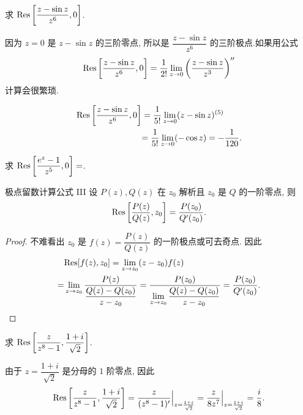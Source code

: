 \begin{example}
	求 ${\mathrm{Res}}\left[\dfrac{z-\sin z}{z^6},0\right]$.
\end{example}

\begin{solution}
		因为 $z=0$ 是 $z-\sin z$ 的三阶零点,
	{所以是 $\dfrac{z-\sin z}{z^6}$ 的三阶极点.如果用公式
		\[{\mathrm{Res}}\left[\frac{z-\sin z}{z^6},0\right]
		=\frac1{2!}\lim_{z\to0}\left(\frac{z-\sin z}{z^3}\right)''\]
		计算会很繁琐.
	}

	{
	\begin{align*}
		{\mathrm{Res}}\left[\frac{z-\sin z}{z^6},0\right]&=\frac1{5!}\lim_{z\to0}(z-\sin z)^{(5)}\\
		&{=\frac1{5!}\lim_{z\to0}(-\cos z)=-\frac1{120}.}
	\end{align*}}
\end{solution}

\begin{exercise}
		求 ${\mathrm{Res}}\left[\dfrac{e^z-1}{z^5},0\right]=$.
\end{exercise}

\begin{theorem}{极点留数计算公式 III}
	设 $P(z),Q(z)$ 在 $z_0$ 解析且 $z_0$ 是 $Q$ 的一阶零点, 则
	\[{\mathrm{Res}}\left[\frac{P(z)}{Q(z)},z_0\right]=\frac{P(z_0)}{Q'(z_0)}.\]
\end{theorem}

\begin{proof}
	不难看出 $z_0$ 是 $f(z)=\dfrac{P(z)}{Q(z)}$ 的一阶极点或可去奇点. 因此
	\begin{align*}
			&{\mathrm{Res}}[f(z),z_0]=\lim_{z\to z_0}(z-z_0)f(z)\\
		=&\lim_{z\to z_0}\frac{P(z)}{\dfrac{Q(z)-Q(z_0)}{z-z_0}}
		=\frac{P(z_0)}{\lim\limits_{z\to z_0}\dfrac{Q(z)-Q(z_0)}{z-z_0}}=\frac{P(z_0)}{Q'(z_0)}.\qedhere
	\end{align*}
\end{proof}

\begin{example}
	求 ${\mathrm{Res}}\left[\dfrac{z}{z^8-1},\dfrac{1+i}{\sqrt2}\right]$.
\end{example}

\begin{solution}
		由于 $z=\dfrac{1+i}{\sqrt2}$ 是分母的 $1$ 阶零点,
	{因此
		\[{\mathrm{Res}}\left[\frac z{z^8-1},\frac{1+i}{\sqrt2}\right]
		=\frac z{(z^8-1)'}\Big|_{z=\frac{1+i}{\sqrt2}}
		=\frac z{8z^7}\Big|_{z=\frac{1+i}{\sqrt2}}
		=\frac i8.\]
	}
\end{solution}


